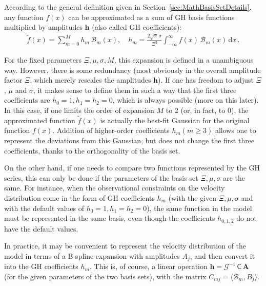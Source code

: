 \documentclass[12pt]{article}
\renewcommand{\d}{\mathrm{d}}
\begin{document}
According to the general definition given in Section~\ref{sec:MathBasisSetDetails}, any function $f(x)$ can be approximated as a sum of GH basis functions multiplied by amplitudes $\boldsymbol{h}$ (also called GH coefficients):
\begin{align}  \label{eq:GHcoefs}
\tilde f(x) = \sum_{m=0}^{M} h_m\, \mathcal B_m(x), \quad
h_m = \frac{2\sqrt{\pi}\,\sigma}{\Xi^2} \int_{-\infty}^{\infty} f(x)\, \mathcal B_m(x)\, \d x \,.
\end{align}

For the fixed parameters $\Xi, \mu, \sigma, M$, this expansion is defined in a unambiguous way. However, there is some redundancy (most obviously in the overall amplitude factor $\Xi$, which merely rescales the amplitudes $\boldsymbol h$). If one has freedom to adjust $\Xi$, $\mu$ and $\sigma$, it makes sense to define them in such a way that the first three coefficients are $h_0=1, h_1=h_2=0$, which is always possible (more on this later). In this case, if one limits the order of expansion $M$ to 2 (or, in fact, to 0), the approximated function $\tilde f(x)$ is actually the best-fit Gaussian for the original function $f(x)$. Addition of higher-order coefficients $h_m (m\ge 3)$ allows one to represent the deviations from this Gaussian, but does not change the first three coefficients, thanks to the orthogonality of the basis set.

On the other hand, if one needs to compare two functions represented by the GH series, this can only be done if the parameters of the basis set $\Xi, \mu, \sigma$ are the same. For instance, when the observational constraints on the velocity distribution come in the form of GH coefficients $h_m$ (with the given $\Xi, \mu, \sigma$ and with the default values of $h_0=1, h_1=h_2=0$), the same function in the model must be represented in the same basis, even though the coefficients $h_{0,1,2}$ do not have the default values.

In practice, it may be convenient to represent the velocity distribution of the model in terms of a B-spline expansion with amplitudes $A_j$, and then convert it into the GH coefficients $h_m$. This is, of course, a linear operation $\boldsymbol h = \mathcal G^{-1}\, \mathsf C \,\boldsymbol A$ (for the given parameters of the two basis sets), with the matrix $C_{mj} = \langle \mathcal B_m, B_j \rangle$.
\end{document}
